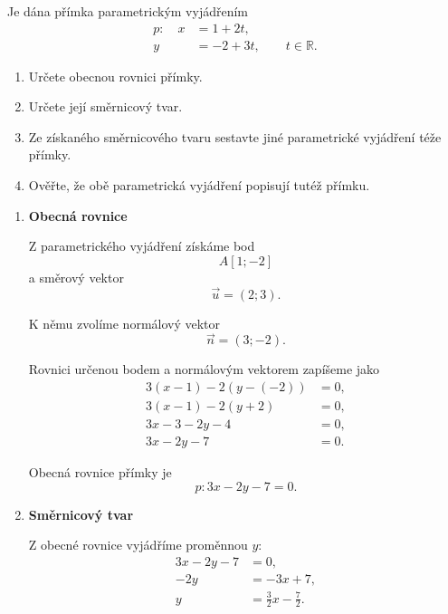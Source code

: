 \begin{example}\label{exa:Line_forms_conversion_summary}
    Je dána přímka parametrickým vyjádřením
    \[
        \begin{aligned}
            p:\quad x&=1+2t,\\
                     y&=-2+3t,
                     \qquad t\in\mathbb{R}.
        \end{aligned}
    \]

    \begin{enumerate}[label=\alph*)]
        \item Určete obecnou rovnici přímky.
        \item Určete její směrnicový tvar.
        \item Ze získaného směrnicového tvaru sestavte jiné
        parametrické vyjádření téže přímky.
        \item Ověřte, že obě parametrická vyjádření popisují tutéž
        přímku.
    \end{enumerate}

    \begin{enumerate}[label=\alph*), leftmargin=2em]

        \item \textbf{Obecná rovnice}

        Z parametrického vyjádření získáme bod
        \[
            A[1;-2]
        \]
        a směrový vektor
        \[
            \vec{u}=(2;3).
        \]

        K němu zvolíme normálový vektor
        \[
            \vec{n}=(3;-2).
        \]

        Rovnici určenou bodem a normálovým vektorem zapíšeme jako
        \begin{align*}
            3(x-1)-2(y-(-2))&=0,\\
            3(x-1)-2(y+2)&=0,\\
            3x-3-2y-4&=0,\\
            3x-2y-7&=0.
        \end{align*}

        Obecná rovnice přímky je
        \[
            p:3x-2y-7=0.
        \]

        \item \textbf{Směrnicový tvar}

        Z obecné rovnice vyjádříme proměnnou $y$:
        \begin{align*}
            3x-2y-7&=0,\\
            -2y&=-3x+7,\\
            y&=\frac{3}{2}x-\frac{7}{2}.
        \end{align*}


\end{enumerate}
\end{example}

